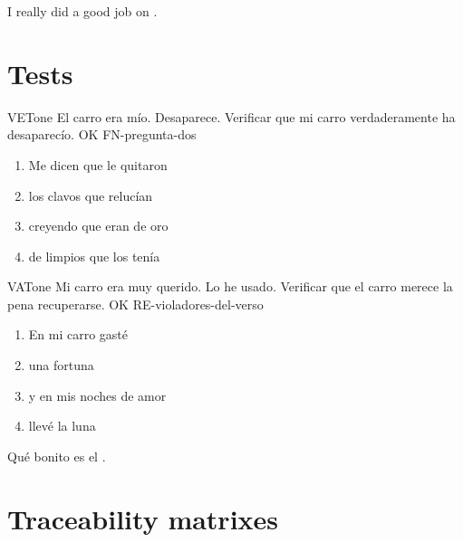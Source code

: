 \documentclass[a4paper,10pt]{article}
\begin{document}
  I really did a good job on .

  \FloatBarrier



  \section{Tests}

  \printtesttemplate

  \begin{testCase}{VET}{one}
    {El carro era mío.}  %
    {Desaparece.}  %
    {Verificar que mi carro verdaderamente ha desaparecío.}  %
    {OK}  %
    {FN-pregunta-dos}  %
    \begin{enumerate}[leftmargin=*, topsep=0pt, noitemsep]
      \item Me dicen que le quitaron
      \item los clavos que relucían
      \item creyendo que eran de oro
      \item de limpios que los tenía
    \end{enumerate}
  \end{testCase}

  \begin{testCase}{VAT}{one}
    {Mi carro era muy querido.}  %
    {Lo he usado.}  %
    {Verificar que el carro merece la pena recuperarse.}  %
    {OK}  %
    {RE-violadores-del-verso}  %
    \begin{enumerate}[leftmargin=*, topsep=0pt, noitemsep]
      \item En mi carro gasté
      \item una fortuna
      \item y en mis noches de amor
      \item llevé la luna
    \end{enumerate}
  \end{testCase}

  \FloatBarrier

  Qué bonito es el .



  \section{Traceability matrixes}
\end{document}

